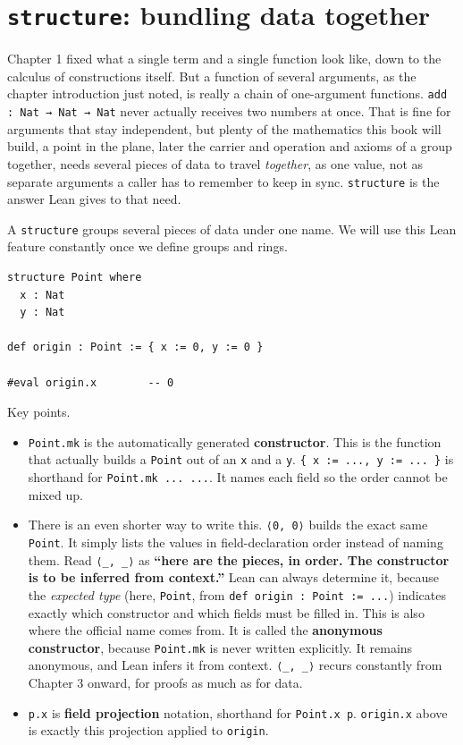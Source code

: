 \section{\texorpdfstring{\texttt{structure}: bundling data together}{structure: bundling data together}}\label{sec:02-functions-and-structures:01-structure-basics:1}

Chapter 1 fixed what a single term and a single function look like, down to the calculus of constructions itself. But a function of several arguments, as the chapter introduction just noted, is really a chain of one-argument functions. \texttt{add : Nat → Nat → Nat} never actually receives two numbers at once. That is fine for arguments that stay independent, but plenty of the mathematics this book will build, a point in the plane, later the carrier and operation and axioms of a group together, needs several pieces of data to travel \emph{together}, as one value, not as separate arguments a caller has to remember to keep in sync. \texttt{structure} is the answer Lean gives to that need.

A \texttt{structure} groups several pieces of data under one name. We will use this Lean feature constantly once we define groups and rings.

\begin{lstlisting}
structure Point where
  x : Nat
  y : Nat

def origin : Point := { x := 0, y := 0 }

#eval origin.x        -- 0
\end{lstlisting}

Key points.

\begin{itemize}
\tightlist
\item
  \texttt{Point.mk} is the automatically generated \textbf{constructor}. This is the function that actually builds a \texttt{Point} out of an \texttt{x} and a \texttt{y}. \texttt{\{ x := ..., y := ... \}} is shorthand for \texttt{Point.mk ... ...}. It names each field so the order cannot be mixed up.
\item
  There is an even shorter way to write this. \texttt{⟨0, 0⟩} builds the exact same \texttt{Point}. It simply lists the values in field-declaration order instead of naming them. Read \texttt{⟨\_\allowbreak{}, \_\allowbreak{}⟩} as \textbf{``here are the pieces, in order. The constructor is to be inferred from context.''} Lean can always determine it, because the \emph{expected type} (here, \texttt{Point}, from \texttt{def origin : Point := ...}) indicates exactly which constructor and which fields must be filled in. This is also where the official name comes from. It is called the \textbf{anonymous constructor}, because \texttt{Point.mk} is never written explicitly. It remains anonymous, and Lean infers it from context. \texttt{⟨\_\allowbreak{}, \_\allowbreak{}⟩} recurs constantly from Chapter 3 onward, for proofs as much as for data.
\item
  \texttt{p.x} is \textbf{field projection} notation, shorthand for \texttt{Point.x p}. \texttt{origin.x} above is exactly this projection applied to \texttt{origin}.
\end{itemize}

